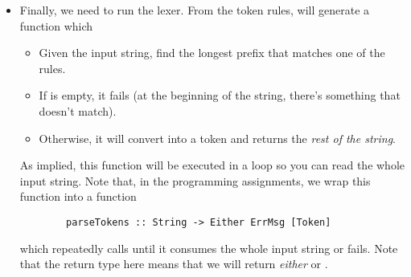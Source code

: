 \documentclass[letterpaper]{article}
\begin{document}
\begin{itemize}
    \bigskip 

    Now, what is going on at the right side? On the right, we have a \textbf{Haskell function} surrounded by curly braces. Each function has \textbf{two arguments}: 
    \begin{itemize}
        \item The first argument is the position (). 
        \item The second one is the string that was parsed. 
    \end{itemize}
    For this, we consider a more interesting example:
    \begin{verbatim}
        $alpha [$alpha $digit \_ \']*       { \p s -> ID     p s }\end{verbatim}
    What this regular expression is saying is  to match anything that looks like an identifier (starts with a letter followed by any letter, digit, underscore, or tick). Then, the function takes in two arguments,  (for position) and  (the string that was parsed) and returns an  with the position and string parsed. 

    \bigskip 

    Note that the last regular expression above is no different; the only difference is that we have , which converts the string read into an .



    \item Finally, we need to run the lexer. From the token rules,  will generate a function  which
    \begin{itemize}
        \item Given the input string, find the longest prefix  that matches one of the rules. 
        \item If  is empty, it fails (at the beginning of the string, there's something that doesn't match).
        \item Otherwise, it will convert  into a token and returns the \emph{rest of the string}. 
    \end{itemize}
    As implied, this function will be executed in a loop so you can read the whole input string. Note that, in the programming assignments, we wrap this function into a function 
    \begin{verbatim}
        parseTokens :: String -> Either ErrMsg [Token]\end{verbatim}
    which repeatedly calls  until it consumes the whole input string or fails. Note that the return type here means that we will return \emph{either}  or \code{[Token]}.


\end{itemize}
\end{document}
